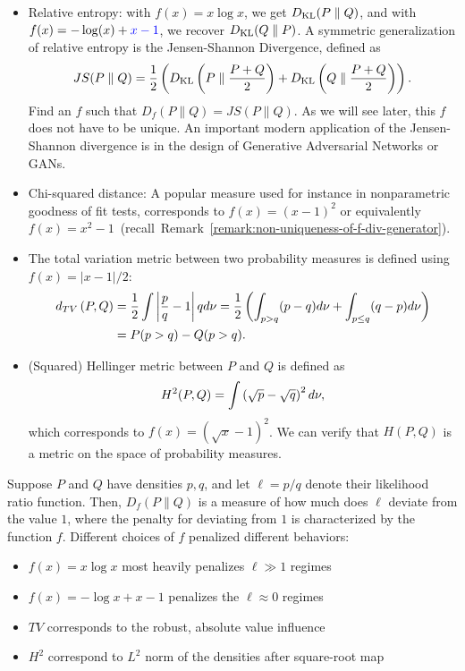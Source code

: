 \documentclass[12pt]{article}
\begin{document}
\begin{itemize}
    \item Relative entropy: with $f(x) = x \log x$, we get $D_{\text{KL}}(P \parallel Q)$, and with $f(x) = -\log(x) + \textcolor{blue}{x - 1}$, we recover $D_{\text{KL}}(Q \parallel P)$. 
    A symmetric generalization of relative entropy is the Jensen-Shannon Divergence, defined as 
    \begin{align}
    JS(P \parallel Q) = \frac{1}{2} \left( D_{\text{KL}}\left( P \parallel \frac{P+Q}{2} \right) +  D_{\text{KL}}\left( Q \parallel \frac{P+Q}{2} \right) \right) . 
    \end{align}
     Find an $f$ such that $D_f(P \parallel Q) = JS(P \parallel Q)$.  As we will see later, this $f$ does not have to be unique. An important modern application of the Jensen-Shannon divergence is in the design of Generative Adversarial Networks or GANs.

    \item Chi-squared distance: A popular measure used for instance in nonparametric goodness of fit tests, corresponds to $f(x) = (x-1)^2$ or equivalently $f(x) = x^2 - 1$~(recall~Remark~\ref{remark:non-uniqueness-of-f-div-generator}). 

    \item The total variation metric between two probability measures is defined using $f(x) = |x-1|/2$:
    \begin{align}
        d_{TV}\left( P, Q \right)  &= \frac{1}{2} \int  \left\lvert  \frac{p}{q} - 1 \right\rvert q d\nu = \frac{1}{2}\left( \int_{p>q} (p-q) d\nu + \int_{p \leq q} (q-p) d\nu \right) \\
		& = P(p>q) - Q(p>q). 
    \end{align}

    \item (Squared) Hellinger metric between $P$ and $Q$ is defined as 
    \begin{align}
    H^2(P, Q) = \int \left( \sqrt{p} - \sqrt{q} \right)^2 d\nu,  
    \end{align}
    which corresponds to $f(x) = (\sqrt{x}-1)^2$. We can verify that $H(P, Q)$ is a metric on the space of probability measures. 
\end{itemize}

\begin{remark}
	\label{remark:f-div-intuition}
	Suppose $P$ and $Q$ have densities $p, q$, and let $\ell = p/q$ denote their likelihood ratio function. Then, $D_f(P \parallel Q)$ is a measure of how much does $\ell$ deviate from the value $1$, where the penalty for deviating from $1$ is characterized by the function $f$. Different choices of $f$ penalized different behaviors: 
	\begin{itemize}
		\item $f(x) = x \log x$ most heavily penalizes $\ell \gg 1$ regimes 
		\item $f(x) = - \log x + x -1$ penalizes the $\ell \approx 0$ regimes  
		\item $TV$ corresponds to the robust, absolute value influence 
		\item $H^2$ correspond to $L^2$ norm of the densities after square-root map
	\end{itemize}
\end{remark}
\end{document}
